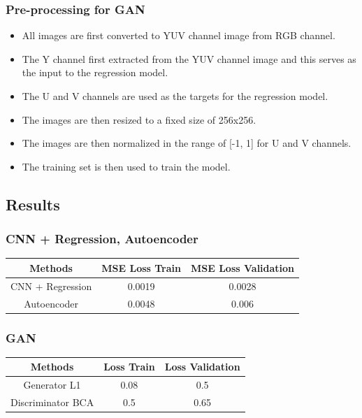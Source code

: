 \documentclass{article}
\begin{document}
\subsubsection{Pre-processing for GAN}
\begin{itemize}
    \item All images are first converted to YUV channel image from RGB channel.
    \item The Y channel first extracted from the YUV channel image and this serves as the input to the regression model.
    \item The U and V channels are used as the targets for the regression model.
    \item The images are then resized to a fixed size of 256x256.
    \item The images are then normalized in the range of [-1, 1] for U and V channels.
    \item The training set is then used to train the model.
\end{itemize}

\subsection{Results}

\subsubsection{CNN + Regression, Autoencoder}

\begin{center}
\begin{tabular}{ |c |c|c| } 
\hline
\textbf{Methods} & \textbf{MSE Loss Train} & \textbf{MSE Loss Validation} \\
\hline
CNN + Regression & 0.0019 & 0.0028 \\
\hline
Autoencoder & 0.0048 & 0.006   \\ 
\hline
\end{tabular}
\end{center}

\subsubsection{GAN}

\begin{center}
\begin{tabular}{ |c |c|c| } 
\hline
\textbf{Methods} & \textbf{Loss Train} & \textbf{Loss Validation} \\
\hline
Generator L1 & 0.08 & 0.5 \\
\hline
Discriminator BCA & 0.5 & 0.65   \\ 
\hline
\end{tabular}
\end{center}
\end{document}
